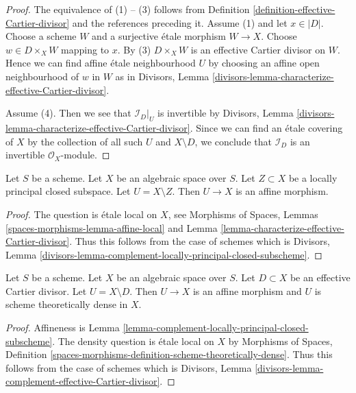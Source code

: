 \begin{proof}
The equivalence of (1) -- (3) follows from
Definition \ref{definition-effective-Cartier-divisor}
and the references preceding it.
Assume (1) and let $x \in |D|$. Choose a scheme $W$ and a
surjective \'etale morphism
$W \to X$. Choose $w \in D \times_X W$ mapping to $x$.
By (3) $D \times_X W$ is an effective Cartier
divisor on $W$. Hence we can find affine \'etale neighbourhood $U$
by choosing an affine open neighbourhood of $w$ in $W$ as in
Divisors, Lemma \ref{divisors-lemma-characterize-effective-Cartier-divisor}.

\medskip\noindent
Assume (4). Then we see that $\mathcal{I}_D|_U$ is invertible by
Divisors, Lemma \ref{divisors-lemma-characterize-effective-Cartier-divisor}.
Since we can find an \'etale covering of $X$ by the collection of
all such $U$ and $X \setminus D$, we conclude that
$\mathcal{I}_D$ is an invertible $\mathcal{O}_X$-module.
\end{proof}

\begin{lemma}
\label{lemma-complement-locally-principal-closed-subscheme}
Let $S$ be a scheme. Let $X$ be an algebraic space over $S$.
Let $Z \subset X$ be a locally principal closed
subspace. Let $U = X \setminus Z$. Then $U \to X$ is an affine morphism.
\end{lemma}

\begin{proof}
The question is \'etale local on $X$, see
Morphisms of Spaces, Lemmas \ref{spaces-morphisms-lemma-affine-local}
and
Lemma \ref{lemma-characterize-effective-Cartier-divisor}.
Thus this follows from the case of schemes which is
Divisors, Lemma
\ref{divisors-lemma-complement-locally-principal-closed-subscheme}.
\end{proof}

\begin{lemma}
\label{lemma-complement-effective-Cartier-divisor}
Let $S$ be a scheme. Let $X$ be an algebraic space over $S$.
Let $D \subset X$ be an effective Cartier divisor.
Let $U = X \setminus D$. Then $U \to X$ is an affine morphism and $U$
is scheme theoretically dense in $X$.
\end{lemma}

\begin{proof}
Affineness is Lemma \ref{lemma-complement-locally-principal-closed-subscheme}.
The density question is \'etale local on $X$ by
Morphisms of Spaces, Definition
\ref{spaces-morphisms-definition-scheme-theoretically-dense}.
Thus this follows from the case of schemes which is
Divisors, Lemma
\ref{divisors-lemma-complement-effective-Cartier-divisor}.
\end{proof}

